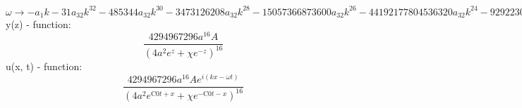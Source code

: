 \documentclass[12pt,a4paper,draft]{article}
\begin{document}
$\omega \to -a_{1} k-31 a_{32} k^{32}-485344 a_{32} k^{30}-3473126208 a_{32} k^{28}-15057366873600 a_{32} k^{26}-44192177804536320 a_{32} k^{24}-92922302849926717440 a_{32} k^{22}-144467461118033949573120 a_{32} k^{20}-168923110456873918556405760 a_{32} k^{18}-149584863248378686441060761600 a_{32} k^{16}-100160811186802047547696658513920 a_{32} k^{14}-50197153142325132725620756273168384 a_{32} k^{12}-18435458343872233720591470538109485056 a_{32} k^{10}-4777509051025952783840027362891778752512 a_{32} k^8-815139646134524043024778591373815059578880 a_{32} k^6-78915008709222913253797769838212049744691200 a_{32} k^4-2559228513232002163991166050097792748093440000 a_{32} k^2+113002394254874739522511034620965159960576000000 a_{32}$\\


y(z) - function:
$$
\frac{4294967296 a^{16} A}{\left(4 a^2 e^z+\chi  e^{-z}\right)^{16}}
$$
u(x, t) - function:
$$
\frac{4294967296 a^{16} A e^{i (k x-\omega  t)}}{\left(4 a^2 e^{\text{C0} t+x}+\chi  e^{-\text{C0} t-x}\right)^{16}}
$$
\end{document}
